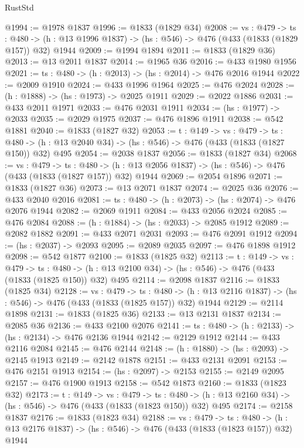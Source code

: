 \begin{lexlean}{RustStd}
\begin{coremodule}
@1994 := @1978 @1837
@1996 := @1833 (@1829 @34)
@2008 := {vs : @479} ->
  {ts : @480} -> (h : @13 @1996 @1837) -> (hs : @546) -> @476 (@433 (@1833 (@1829 @157)) @32) @1944
@2009 := @1994 @1894
@2011 := @1833 (@1829 @36)
@2013 := @13 @2011 @1837
@2014 := @1965 @36
@2016 := @433 @1980 @1956
@2021 := {ts : @480} -> (h : @2013) -> (hs : @2014) -> @476 @2016 @1944
@2022 := @2009 @1910
@2024 := @433 @1996 @1964
@2025 := @476 @2024
@2028 := (h : @1888) -> (hs : @1973) -> @2025 @1911
@2029 := @2022 @1886
@2031 := @433 @2011 @1971
@2033 := @476 @2031 @1911
@2034 := (hs : @1977) -> @2033
@2035 := @2029 @1975
@2037 := @476 @1896 @1911
@2038 := @542 @1881
@2040 := @1833 (@1827 @32)
@2053 := {t : @149} ->
  {vs : @479} ->
  {ts : @480} -> (h : @13 @2040 @34) -> (hs : @546) -> @476 (@433 (@1833 (@1827 @150)) @32) @495
@2054 := @2038 @1837
@2056 := @1833 (@1827 @34)
@2068 := {vs : @479} ->
  {ts : @480} -> (h : @13 @2056 @1837) -> (hs : @546) -> @476 (@433 (@1833 (@1827 @157)) @32) @1944
@2069 := @2054 @1896
@2071 := @1833 (@1827 @36)
@2073 := @13 @2071 @1837
@2074 := @2025 @36
@2076 := @433 @2040 @2016
@2081 := {ts : @480} -> (h : @2073) -> (hs : @2074) -> @476 @2076 @1944
@2082 := @2069 @1911
@2084 := @433 @2056 @2024
@2085 := @476 @2084
@2088 := (h : @1884) -> (hs : @2033) -> @2085 @1912
@2089 := @2082 @1882
@2091 := @433 @2071 @2031
@2093 := @476 @2091 @1912
@2094 := (hs : @2037) -> @2093
@2095 := @2089 @2035
@2097 := @476 @1898 @1912
@2098 := @542 @1877
@2100 := @1833 (@1825 @32)
@2113 := {t : @149} ->
  {vs : @479} ->
  {ts : @480} -> (h : @13 @2100 @34) -> (hs : @546) -> @476 (@433 (@1833 (@1825 @150)) @32) @495
@2114 := @2098 @1837
@2116 := @1833 (@1825 @34)
@2128 := {vs : @479} ->
  {ts : @480} -> (h : @13 @2116 @1837) -> (hs : @546) -> @476 (@433 (@1833 (@1825 @157)) @32) @1944
@2129 := @2114 @1898
@2131 := @1833 (@1825 @36)
@2133 := @13 @2131 @1837
@2134 := @2085 @36
@2136 := @433 @2100 @2076
@2141 := {ts : @480} -> (h : @2133) -> (hs : @2134) -> @476 @2136 @1944
@2142 := @2129 @1912
@2144 := @433 @2116 @2084
@2145 := @476 @2144
@2148 := (h : @1880) -> (hs : @2093) -> @2145 @1913
@2149 := @2142 @1878
@2151 := @433 @2131 @2091
@2153 := @476 @2151 @1913
@2154 := (hs : @2097) -> @2153
@2155 := @2149 @2095
@2157 := @476 @1900 @1913
@2158 := @542 @1873
@2160 := @1833 (@1823 @32)
@2173 := {t : @149} ->
  {vs : @479} ->
  {ts : @480} -> (h : @13 @2160 @34) -> (hs : @546) -> @476 (@433 (@1833 (@1823 @150)) @32) @495
@2174 := @2158 @1837
@2176 := @1833 (@1823 @34)
@2188 := {vs : @479} ->
  {ts : @480} -> (h : @13 @2176 @1837) -> (hs : @546) -> @476 (@433 (@1833 (@1823 @157)) @32) @1944

\end{coremodule}
\end{lexlean}
